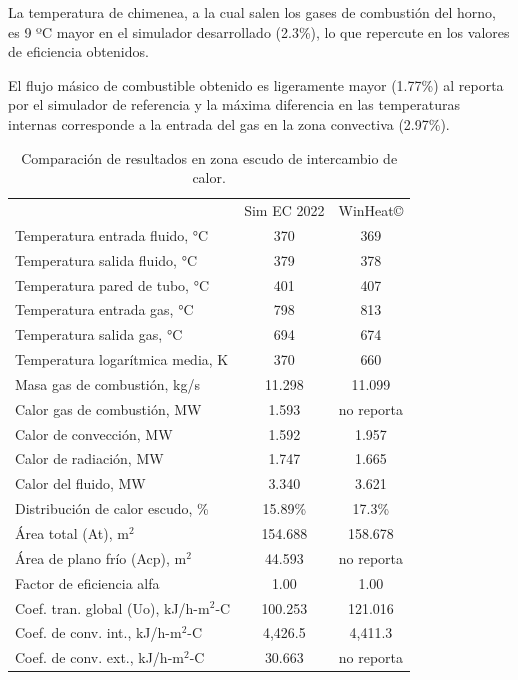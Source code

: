 \par La temperatura de chimenea, a la cual salen los gases de combustión del horno, es 9 ºC mayor en el simulador desarrollado (2.3\%), lo que repercute en los valores de eficiencia obtenidos.

\par El flujo másico de combustible obtenido es ligeramente mayor (1.77\%) al reporta por el simulador de referencia y la máxima diferencia en las temperaturas internas corresponde a la entrada del gas en la zona convectiva (2.97\%).

\begin{table}
\begin{center}
\caption[Resultados en zona escudo de intercambio de calor]{Comparación de resultados en zona escudo de intercambio de calor.}
\label{tbl:compara-ze}
\begin{tabular}{l|c|c}
	& Sim EC 2022 & WinHeat\copyright \\
Temperatura entrada fluido, °C		& 370 & 369	\\
Temperatura salida fluido, °C		& 379 & 378	\\
Temperatura pared de tubo, °C		& 401 & 407	\\
Temperatura entrada gas, °C			& 798 & 813	\\
Temperatura salida gas, °C			& 694 & 674	\\
Temperatura logarítmica media, K	& 370 & 660 \\
Masa gas de combustión, kg/s	& 11.298 & 11.099	\\

Calor gas de combustión, MW		& 1.593 & no reporta \\
Calor de convección, MW			& 1.592 & 1.957	\\
Calor de radiación, MW			& 1.747 & 1.665	\\
Calor del fluido, MW			& 3.340 & 3.621	\\
Distribución de calor escudo, \%	& 15.89\% &  17.3\% \\

Área total (At), m$^2$				& 154.688 & 158.678 \\
Área de plano frío (Acp), m$^2$		& 44.593 & no reporta \\
Factor de eficiencia alfa			& 1.00 & 1.00 \\

Coef. tran. global (Uo), kJ/h-m$^2$-C	& 100.253  & 121.016 \\
Coef. de conv. int., kJ/h-m$^2$-C	& 4,426.5 & 4,411.3 \\
Coef. de conv. ext., kJ/h-m$^2$-C	& 30.663 & no reporta \\
\end{tabular}
\end{center}
\end{table}

